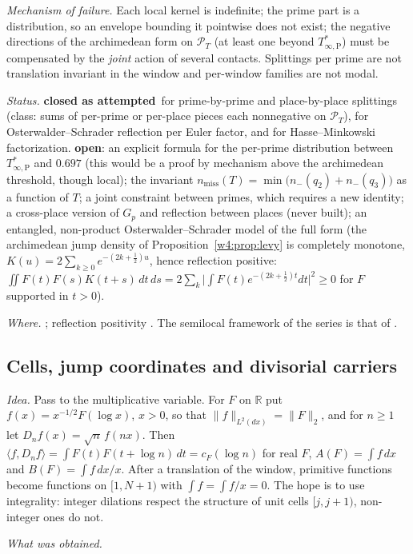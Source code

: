 \documentclass[11pt]{amsart}
\theoremstyle{definition}
\theoremstyle{remark}
\numberwithin{equation}{section}
\newcommand{\R}{\mathbb{R}}
\newcommand{\cF}{c_F}                                  %
\newcommand{\PT}{\mathcal{P}_T}                        %
\newcommand{\Tarch}{T^{*}_{\infty,\mathrm P}}          %
\newcommand{\rtag}[1]{\textbf{\small\textsf{#1}}}
\newcommand{\closedA}{\rtag{closed as attempted}}
\newcommand{\openR}{\rtag{open}}
\newcommand{\entry}[1]{\par\smallskip\noindent\textit{#1.}\enspace}
\begin{document}
\entry{Mechanism of failure} Each local kernel is indefinite; the prime part is a distribution, so an envelope bounding it pointwise
does not exist; the negative directions of the archimedean form on $\PT$ (at least one beyond $\Tarch$) must be compensated by the
\emph{joint} action of several contacts. Splittings per prime are not translation invariant in the window and per-window families are not
modal.

\entry{Status} \closedA\ for prime-by-prime and place-by-place splittings (class: sums of per-prime or per-place pieces each nonnegative on
$\PT$), for Osterwalder--Schrader reflection per Euler factor, and for Hasse--Minkowski factorization. \openR: an explicit formula for the
per-prime distribution between $\Tarch$ and $0.697$ (this would be a proof by mechanism above the archimedean threshold, though local);
the invariant $n_{\mathrm{miss}}(T)=\min\big(n_-(q_2)+n_-(q_3)\big)$ as a function of $T$; a joint constraint between primes, which requires
a new identity; a cross-place version of $G_p$ and reflection between places (never built); an entangled, non-product
Osterwalder--Schrader model of the full form (the archimedean jump density of Proposition~\ref{w4:prop:levy} is completely monotone, $K(u)=2\sum_{k\ge0}e^{-(2k+\frac12)u}$, hence reflection positive: $\iint F(t)F(s)K(t+s)\,dt\,ds=2\sum_k\big|\int F(t)e^{-(2k+\frac12)t}dt\big|^2\ge0$ for $F$ supported in $t>0$).

\entry{Where} \cite{P09,P10}; reflection positivity \cite{OsterwalderSchrader1973}. The semilocal framework of the series is that of
\cite{P43,P45}.

\subsection{Cells, jump coordinates and divisorial carriers}\label{w4:fam:R4}

\entry{Idea} Pass to the multiplicative variable. For $F$ on $\R$ put $f(x)=x^{-1/2}F(\log x)$, $x>0$, so that $\|f\|_{L^2(dx)}=\|F\|_2$, and
for $n\ge1$ let $D_nf(x)=\sqrt n\,f(nx)$. Then $\langle f,D_nf\rangle=\int F(t)F(t+\log n)\,dt=\cF(\log n)$ for real $F$, $A(F)=\int f\,dx$ and
$B(F)=\int f\,dx/x$. After a translation of the window, primitive functions become functions on $[1,N+1)$ with $\int f=\int f/x=0$. The hope
is to use integrality: integer dilations respect the structure of unit cells $[j,j+1)$, non-integer ones do not.

\entry{What was obtained}
\end{document}
